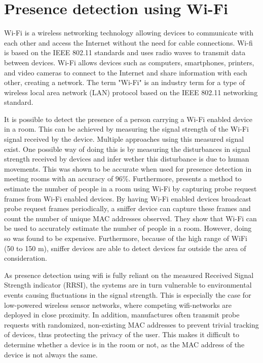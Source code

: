 \section{Presence detection using Wi-Fi} \label{sec:wi-fi}
Wi-Fi is a wireless networking technology allowing devices to communicate with each other and access the Internet without the need for cable connections. 
Wi-fi is based on the IEEE 802.11\cite{iEEE80211} standards and uses radio waves to transmit data between devices.
Wi-Fi allows devices such as computers, smartphones, printers, and video cameras to connect to the Internet and share information with each other, creating a network.
The term "Wi-Fi" is an industry term for a type of wireless local area network (LAN) protocol based on the IEEE 802.11 networking standard.\cite{WiFiAllianceDiscover,CiscoWhatIsWiFi}

It is possible to detect the presence of a person carrying a Wi-Fi enabled device in a room.
This can be achieved by measuring the signal strength of the Wi-Fi signal received by the device.
Multiple approaches using this measured signal exist. 
One possible way of doing this is by measuring the disturbances in signal strength received by devices and infer wether this disturbance is due to human movements. 
This was shown to be accurate when used for presence detection in meeting rooms with an accuracy of 96\%. \cite{wifi_presence_detection_df}
Furthermore,\citeauthor{longoAccurateOccupancyEstimation2019}\cite{longoAccurateOccupancyEstimation2019} presents a method to estimate the number of people in a room using Wi-Fi by capturing probe request frames from Wi-Fi enabled devices.
By having Wi-Fi enabled devices broadcast probe request frames periodically, a sniffer device can capture these frames and count the number of unique MAC addresses observed.
They show that Wi-Fi can be used to accurately estimate the number of people in a room.
However, doing so was found to be expensive.
Furthermore, because of the high range of WiFi (50 to 150 m), sniffer devices are able to detect devices far outside the area of consideration.\cite{longoAccurateOccupancyEstimation2019}

As presence detection using wifi is fully reliant on the measured Received Signal Strength indicator (RRSI), the systems are in turn vulnerable to environmental events causing fluctuations in the signal strength.
This is especially the case for low-powered wireless sensor networks, where competing wifi-networks are deployed in close proximity.\cite{competing_wifi}
In addition, manufactures often transmit probe requests with randomized, non-existing MAC addresses to prevent trivial tracking of devices, thus protecting the privacy of the user.
This makes it difficult to determine whether a device is in the room or not, as the MAC address of the device is not always the same.\cite{longoAccurateOccupancyEstimation2019}